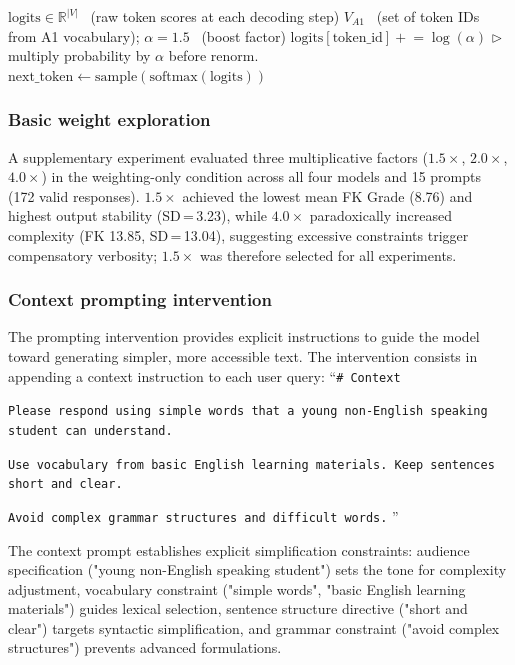 \documentclass[10pt, a4paper]{article}
\let\oldtexttt\texttt
\renewcommand{\texttt}[1]{{\small\oldtexttt{#1}}}
\begin{document}
\begin{algorithm}[h]
\caption{Vocabulary Probability Weighting (per decoding step)}
\label{alg:weighting}
\begin{algorithmic}[1]
\Require $\text{logits} \in \mathbb{R}^{|V|}$ \ (raw token scores at each decoding step)
\Require $V_{A1}$ \ (set of token IDs from A1 vocabulary); $\alpha = 1.5$ \ (boost factor)
        \State $\text{logits}[\text{token\_id}] \mathrel{+}= \log(\alpha)$ \hfill $\triangleright$ multiply probability by $\alpha$ before renorm.
    \EndFor
    \State $\text{next\_token} \gets \text{sample}\!\left(\text{softmax}(\text{logits})\right)$
\EndFor
\end{algorithmic}
\end{algorithm}


\subsubsection{Basic weight exploration}
A supplementary experiment evaluated three multiplicative factors ($1.5\times$, $2.0\times$, $4.0\times$) in the weighting-only condition across all four models and 15 prompts (172 valid responses). $1.5\times$ achieved the lowest mean FK Grade (8.76) and highest output stability (SD\,=\,3.23), while $4.0\times$ paradoxically increased complexity (FK 13.85, SD\,=\,13.04), suggesting excessive constraints trigger compensatory verbosity; $1.5\times$ was therefore selected for all experiments.

\subsubsection{Context prompting intervention}
The prompting intervention provides explicit instructions to guide the model toward generating simpler, more accessible text. The intervention consists in appending a context instruction to each user query:
``\texttt{\# Context}

\texttt{Please respond using simple words that a young non-English speaking student can understand.} 

\texttt{Use vocabulary from basic English learning materials. Keep sentences short and clear.}

\texttt{Avoid complex grammar structures and difficult words.}
''


The context prompt establishes explicit simplification constraints: audience specification ("young non-English speaking student") sets the tone for complexity adjustment, vocabulary constraint ("simple words", "basic English learning materials") guides lexical selection, sentence structure directive ("short and clear") targets syntactic simplification, and grammar constraint ("avoid complex structures") prevents advanced formulations.
\end{document}
